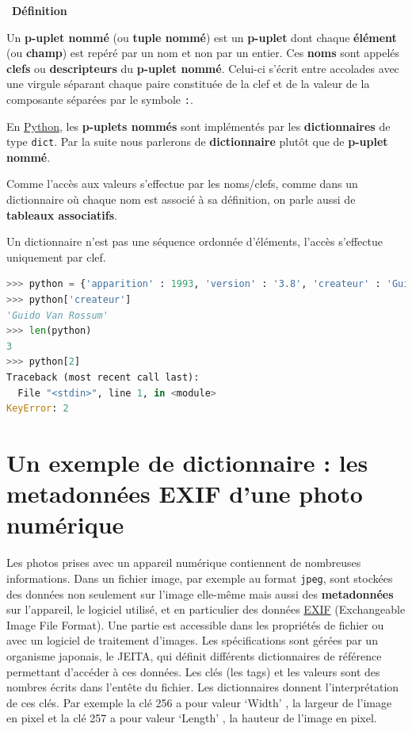 \documentclass[
  11pt,
]{article}
\newcommand{\passthrough}[1]{#1}
\newcounter{prop}
\newcounter{def}
\newenvironment{definition}[1]
{\par \medskip   \addtocounter{def}{1} \noindent  
\begin{bclogo}[arrondi =0.1,  ombre = true, barre=none, logo=\bcbook, marge=4]{~\textbf{Définition} \textbf{\thedef} {\itshape #1} }  \par}
{
\end{bclogo}
 \par \bigskip }
\newcounter{logi}
\begin{document}
\begin{definition}{}

Un \textbf{p-uplet nommé} (ou \textbf{tuple nommé}) est un
\textbf{p-uplet} dont chaque \textbf{élément} (ou \textbf{champ}) est
repéré par un nom et non par un entier. Ces \textbf{noms} sont appelés
\textbf{clefs} ou \textbf{descripteurs} du \textbf{p-uplet nommé}.
Celui-ci s'écrit entre accolades avec une virgule séparant chaque paire
constituée de la clef et de la valeur de la composante séparées par le
symbole \passthrough{\lstinline!:!}.

En
\href{https://docs.python.org/3/tutorial/datastructures.html}{Python},
les \textbf{p-uplets nommés} sont implémentés par les
\textbf{dictionnaires} de type \passthrough{\lstinline!dict!}. Par la
suite nous parlerons de \textbf{dictionnaire} plutôt que de
\textbf{p-uplet nommé}.

Comme l'accès aux valeurs s'effectue par les noms/clefs, comme dans un
dictionnaire où chaque nom est associé à sa définition, on parle aussi
de \textbf{tableaux associatifs}.

Un dictionnaire n'est pas une séquence ordonnée d'éléments, l'accès
s'effectue uniquement par clef.

\begin{lstlisting}[language=Python]
>>> python = {'apparition' : 1993, 'version' : '3.8', 'createur' : 'Guido Van Rossum'}
>>> python['createur']
'Guido Van Rossum'
>>> len(python)
3
>>> python[2]
Traceback (most recent call last):
  File "<stdin>", line 1, in <module>
KeyError: 2
\end{lstlisting}

\end{definition}

\hypertarget{un-exemple-de-dictionnaire-les-metadonnuxe9es-exif-dune-photo-numuxe9rique}{%
\section{Un exemple de dictionnaire : les metadonnées EXIF d'une photo
numérique}\label{un-exemple-de-dictionnaire-les-metadonnuxe9es-exif-dune-photo-numuxe9rique}}

Les photos prises avec un appareil numérique contiennent de nombreuses
informations. Dans un fichier image, par exemple au format
\passthrough{\lstinline!jpeg!}, sont stockées des données non seulement
sur l'image elle-même mais aussi des \textbf{metadonnées} sur
l'appareil, le logiciel utilisé, et en particulier des données
\href{https://fr.wikipedia.org/wiki/Exchangeable_image_file_format}{EXIF}
(Exchangeable Image File Format). Une partie est accessible dans les
propriétés de fichier ou avec un logiciel de traitement d'images. Les
spécifications sont gérées par un organisme japonais, le JEITA, qui
définit différents dictionnaires de référence permettant d'accéder à ces
données. Les clés (les tags) et les valeurs sont des nombres écrits dans
l'entête du fichier. Les dictionnaires donnent l'interprétation de ces
clés. Par exemple la clé 256 a pour valeur `Width' , la largeur de
l'image en pixel et la clé 257 a pour valeur `Length' , la hauteur de
l'image en pixel.
\end{document}
